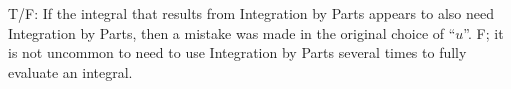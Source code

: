 {T/F: If the integral that results from Integration by Parts appears to also need Integration by Parts, then a mistake was made in the original choice of ``$u$''.}
{F; it is not uncommon to need to use Integration by Parts several times to fully evaluate an integral.
}

